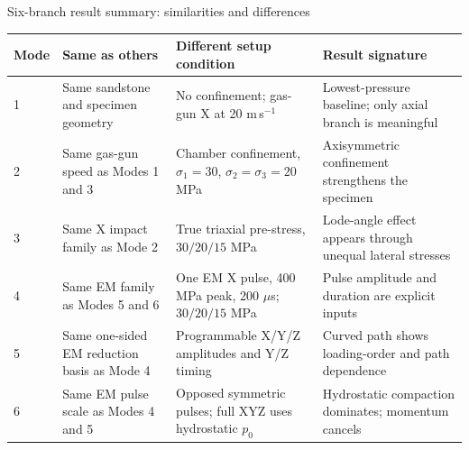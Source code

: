 \documentclass[11pt,aspectratio=169]{beamer}
\newcommand{\toprule}{\hline}
\newcommand{\midrule}{\hline}
\newcommand{\bottomrule}{\hline}
\begin{document}
\begin{frame}{Six-branch result summary: similarities and differences}
  \scriptsize
  \begin{tabular}{@{}p{}p{}p{}p{}@{}}
    \toprule
    \textbf{Mode} & \textbf{Same as others} & \textbf{Different setup condition} & \textbf{Result signature} \\
    \midrule
    1 & Same sandstone and specimen geometry & No confinement; gas-gun X at 20 m\,s$^{-1}$ & Lowest-pressure baseline; only axial branch is meaningful \\
    2 & Same gas-gun speed as Modes 1 and 3 & Chamber confinement, $\sigma_1=30$, $\sigma_2=\sigma_3=20$ MPa & Axisymmetric confinement strengthens the specimen \\
    3 & Same X impact family as Mode 2 & True triaxial pre-stress, $30/20/15$ MPa & Lode-angle effect appears through unequal lateral stresses \\
    4 & Same EM family as Modes 5 and 6 & One EM X pulse, 400 MPa peak, 200 $\mu$s; $30/20/15$ MPa & Pulse amplitude and duration are explicit inputs \\
    5 & Same one-sided EM reduction basis as Mode 4 & Programmable X/Y/Z amplitudes and Y/Z timing & Curved path shows loading-order and path dependence \\
    6 & Same EM pulse scale as Modes 4 and 5 & Opposed symmetric pulses; full XYZ uses hydrostatic $p_0$ & Hydrostatic compaction dominates; momentum cancels \\
    \bottomrule
  \end{tabular}
\end{frame}
\end{document}

